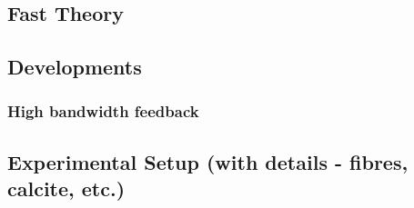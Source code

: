 \subsection{Fast Theory}

\subsection{Developments}

\subsubsection{High bandwidth feedback}


\subsection{Experimental Setup (with details - fibres, calcite, etc.)}

